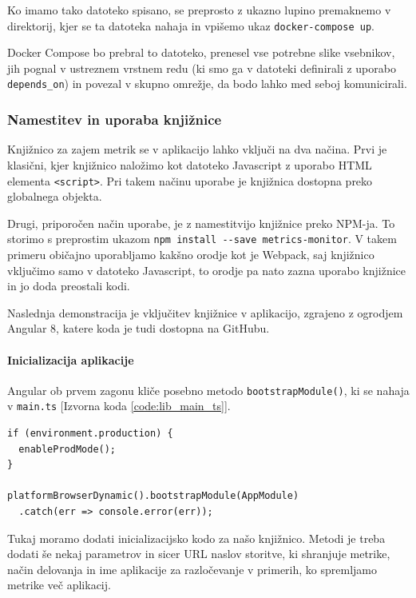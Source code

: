 \documentclass[a4paper, 12pt]{book}
\begin{document}
Ko imamo tako datoteko spisano, se preprosto z ukazno lupino premaknemo v direktorij, kjer se ta datoteka nahaja in vpišemo ukaz \verb|docker-compose up|.

Docker Compose bo prebral to datoteko, prenesel vse potrebne slike vsebnikov, jih pognal v ustreznem vrstnem redu (ki smo ga v datoteki definirali z uporabo \verb|depends_on|) in povezal v skupno omrežje, da bodo lahko med seboj komunicirali.

\subsubsection{Namestitev in uporaba knjižnice}

Knjižnico za zajem metrik se v aplikacijo lahko vključi na dva načina. Prvi je klasični, kjer knjižnico naložimo kot datoteko Javascript z uporabo HTML elementa \verb|<script>|. Pri takem načinu uporabe je knjižnica dostopna preko globalnega objekta.

Drugi, priporočen način uporabe, je z namestitvijo knjižnice preko NPM-ja. To storimo s preprostim ukazom \verb|npm install --save metrics-monitor|. V takem primeru običajno uporabljamo kakšno orodje kot je Webpack, saj knjižnico vključimo samo v datoteko Javascript, to orodje pa nato zazna uporabo knjižnice in jo doda preostali kodi.

Naslednja demonstracija je vključitev knjižnice v aplikacijo, zgrajeno z ogrodjem Angular 8, katere koda je tudi dostopna na GitHubu.

\paragraph{Inicializacija aplikacije} 
Angular ob prvem zagonu kliče posebno metodo \verb|bootstrapModule()|, ki se nahaja v \verb|main.ts| [Izvorna koda \ref{code:lib_main_ts}].

\begin{lstlisting}[label=code:lib_main_ts, caption=Zagon Angular aplikacije]
if (environment.production) {
  enableProdMode();
}

platformBrowserDynamic().bootstrapModule(AppModule)
  .catch(err => console.error(err));
\end{lstlisting}

Tukaj moramo dodati inicializacijsko kodo za našo knjižnico. Metodi je treba dodati še nekaj parametrov in sicer URL naslov storitve, ki shranjuje metrike, način delovanja in ime aplikacije za razločevanje v primerih, ko spremljamo metrike več aplikacij. \\
\end{document}
